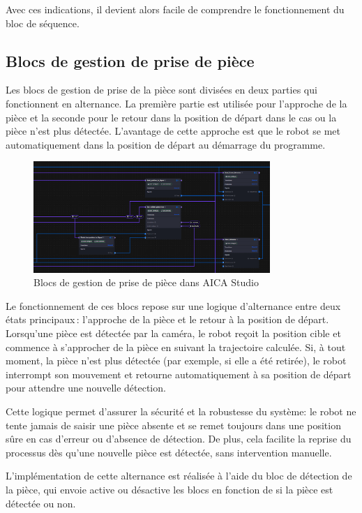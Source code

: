 Avec ces indications, il devient alors facile de comprendre le fonctionnement du bloc de séquence.

\subsection{Blocs de gestion de prise de pièce}

Les blocs de gestion de prise de la pièce sont divisées en deux parties qui fonctionnent en alternance. La première partie est utilisée pour l'approche de la pièce et la seconde pour le retour dans la position de départ dans le cas ou la pièce n'est plus détectée. L'avantage de cette approche est que le robot se met automatiquement dans la position de départ au démarrage du programme.

\begin{figure}[H]
    \centering
    \includegraphics[width=0.8\textwidth]{assets/figures/AICA_Prise (2).png}
    \caption{Blocs de gestion de prise de pièce dans AICA Studio}
    \label{fig:piece_block}
\end{figure}


Le fonctionnement de ces blocs repose sur une logique d'alternance entre deux états principaux : l'approche de la pièce et le retour à la position de départ. Lorsqu'une pièce est détectée par la caméra, le robot reçoit la position cible et commence à s'approcher de la pièce en suivant la trajectoire calculée. Si, à tout moment, la pièce n'est plus détectée (par exemple, si elle a été retirée), le robot interrompt son mouvement et retourne automatiquement à sa position de départ pour attendre une nouvelle détection.

Cette logique permet d'assurer la sécurité et la robustesse du système: le robot ne tente jamais de saisir une pièce absente et se remet toujours dans une position sûre en cas d'erreur ou d'absence de détection. De plus, cela facilite la reprise du processus dès qu'une nouvelle pièce est détectée, sans intervention manuelle.

L'implémentation de cette alternance est réalisée à l'aide du bloc de détection de la pièce, qui envoie active ou désactive les blocs en fonction de si la pièce est détectée ou non.


